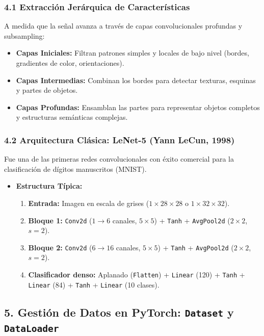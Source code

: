 \subsubsection{4.1 Extracción Jerárquica de Características}

A medida que la señal avanza a través de capas convolucionales profundas y subsampling:
\begin{itemize}
	\item \textbf{Capas Iniciales:} Filtran patrones simples y locales de bajo nivel (bordes, gradientes de color, orientaciones).
	\item \textbf{Capas Intermedias:} Combinan los bordes para detectar texturas, esquinas y partes de objetos.
	\item \textbf{Capas Profundas:} Ensamblan las partes para representar objetos completos y estructuras semánticas complejas.
\end{itemize}

\subsubsection{4.2 Arquitectura Clásica: LeNet-5 (Yann LeCun, 1998)}

Fue una de las primeras redes convolucionales con éxito comercial para la clasificación de dígitos manuscritos (MNIST).

\begin{itemize}
	\item \textbf{Estructura Típica:}
	\begin{enumerate}
		\item \textbf{Entrada:} Imagen en escala de grises ($1 \times 28 \times 28$ o $1 \times 32 \times 32$).
		\item \textbf{Bloque 1:} \texttt{Conv2d} ($1 \rightarrow 6$ canales, $5\times5$) + \texttt{Tanh} + \texttt{AvgPool2d} ($2\times2$, $s=2$).
		\item \textbf{Bloque 2:} \texttt{Conv2d} ($6 \rightarrow 16$ canales, $5\times5$) + \texttt{Tanh} + \texttt{AvgPool2d} ($2\times2$, $s=2$).
		\item \textbf{Clasificador denso:} Aplanado (\texttt{Flatten}) + \texttt{Linear} (120) + \texttt{Tanh} + \texttt{Linear} (84) + \texttt{Tanh} + \texttt{Linear} (10 clases).
	\end{enumerate}
\end{itemize}

\subsection{5. Gestión de Datos en PyTorch: \texttt{Dataset} y \texttt{DataLoader}}

